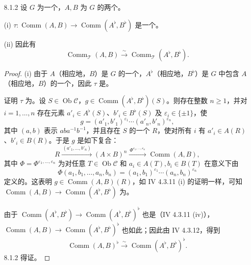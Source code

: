 \begin{SGAresult}{}{8.1.2}
设 $G$ 为一个，$A,B$ 为 $G$ 的两个。

(i)  $\tau:\operatorname{Comm}(A,B)\to\operatorname{Comm}(A^\flat,B^\flat)$ 是一个。

(ii) 因此有
\[
\operatorname{Comm}_{\mathscr T}(A,B)\xrightarrow{\sim}
\operatorname{Comm}_{\mathscr T}(A^\flat,B^\flat).
\]
\end{SGAresult}
\begin{proof}
(i) 由于 $A$（相应地，$B$）是 $G$ 的一个，$A^\flat$（相应地，$B^\flat$）是 $G$ 中包含 $A$（相应地，$B$）的一个，因此 $\tau$ 是。

证明 $\tau$ 为。设 $S\in\operatorname{Ob}\mathscr C$，$g\in\operatorname{Comm}(A^\flat,B^\flat)(S)$。则存在整数 $n\geq1$，并对 $i=1,\ldots,n$ 存在元素 $a'_i\in A^\flat(S)$、$b'_i\in B^\flat(S)$ 及 $\varepsilon_i\in\{\pm1\}$，使
\[
g=(a'_1,b'_1)^{\varepsilon_1}\cdots(a'_n,b'_n)^{\varepsilon_n},
\]
其中 $(a,b)$ 表示 $aba^{-1}b^{-1}$，并且存在 $S$ 的一个 $R$，使对所有 $i$ 有 $a'_i\in A(R)$、$b'_i\in B(R)$。于是 $g$ 是如下复合：
\[
R\xrightarrow{\,(a'_1,\ldots,b'_n)\,}(A\times B)^n
\xrightarrow{\,\Phi^{\varepsilon_1,\ldots,\varepsilon_n}\,}\operatorname{Comm}(A,B),
\]
其中 $\Phi=\Phi^{\varepsilon_1,\ldots,\varepsilon_n}$ 为对任意 $T\in\operatorname{Ob}\mathscr C$ 和 $a_i\in A(T),b_i\in B(T)$ 在意义下由
\[
\Phi(a_1,b_1,\ldots,a_n,b_n)=(a_1,b_1)^{\varepsilon_1}\cdots(a_n,b_n)^{\varepsilon_n}
\]
定义的。这表明 $g\in\operatorname{Comm}(A,B)(R)$，如 IV 4.3.11 (i) 的证明一样，可知 $\operatorname{Comm}(A,B)\to\operatorname{Comm}(A^\flat,B^\flat)$ 为。

由于 $\operatorname{Comm}(A^\flat,B^\flat)\to\operatorname{Comm}(A^\flat,B^\flat)^\flat$ 也是（IV 4.3.11 (iv)），$\operatorname{Comm}(A,B)\to\operatorname{Comm}(A^\flat,B^\flat)^\flat$ 也如此；因此由 IV 4.3.12，得到
\[
\operatorname{Comm}(A,B)^\flat\xrightarrow{\sim}
\operatorname{Comm}(A^\flat,B^\flat)^\flat.
\]
 8.1.2 得证。
\end{proof}


